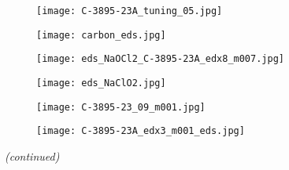 \begin{figure}[htbp]
\ContinuedFloat
    \centering
    \begin{subfigure}[t]{\textwidth}
        \caption{}\label{fig:subBa_particle_carbon}
          \begin{minipage}[t]{0.43\linewidth}
            \centering
            \texttt{[image: C-3895-23A\_tuning\_05.jpg]}%
          \end{minipage}
          \hfill
          \begin{minipage}[t]{0.43\linewidth}
            \centering
            \texttt{[image: carbon\_eds.jpg]}
          \end{minipage}
          \begin{minipage}[t]{0.11\linewidth}
            \centering
            \atomicTable[&][&][&]
          \end{minipage}
    \end{subfigure}%
    \par\bigskip
    \begin{subfigure}[t]{\textwidth}
    \caption{}\label{fig:EDS_NaClO}
          \begin{minipage}[t]{0.43\linewidth}
            \centering
            \texttt{[image: eds\_NaOCl2\_C-3895-23A\_edx8\_m007.jpg]}
          \end{minipage}
          \hfill
          \begin{minipage}[t]{0.43\linewidth}
            \centering
            \texttt{[image: eds\_NaClO2.jpg]}
          \end{minipage}
          \begin{minipage}[t]{0.11\linewidth}
            \centering
            \atomicTable[&][&][&]
          \end{minipage}
    \end{subfigure}%
    \par\bigskip
    \begin{subfigure}[t]{\textwidth}
        \caption{}\label{fig:SEM_C389523_void_eds}
          \begin{minipage}[t]{0.43\linewidth}

            \centering
            \texttt{[image: C-3895-23\_09\_m001.jpg]}%
          \end{minipage}
          \hfill
          \begin{minipage}[t]{0.43\linewidth}
            \centering
            \texttt{[image: C-3895-23A\_edx3\_m001\_eds.jpg]}
          \end{minipage}
          \begin{minipage}[t]{0.11\linewidth}
            \centering
            \atomicTable[&][&][&]
          \end{minipage}
    \end{subfigure}%
    \captionsetup{list=no}
    \caption{\emph{(continued)}}
\end{figure}
